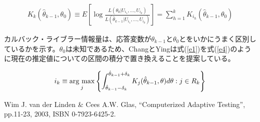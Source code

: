 \documentclass[a4j]{jarticle}
\begin{document}
\begin{eqnarray}
  \label{e3}
  K_{k}(\hat{\theta}_{k-1},\theta_{0}) \equiv E[\log\frac{L(\theta_{0}|U_{i_{1}},\ldots,U_{i_{k}})}{L(\hat{\theta}_{k-1}|U_{i_{1}},\ldots,U_{i_{k}})}] = \sum_{h=1}^{k}K_{i_{h}}(\hat{\theta}_{k-1},\theta_{0})
\end{eqnarray}

カルバック・ライブラー情報量は、応答変数が$\hat{\theta}_{k-1}$と$\theta_{0}$とをいかにうまく区別しているかを示す。$\theta_{0}$は未知であるため、ChangとYingは式(\ref{e1})を式(\ref{e4})のように現在の推定値についての区間の積分で置き換えることを提案している。

\newcommand{\argmax}{\mathop{\rm arg~max}\limits}
\begin{eqnarray}
  \label{e4}
  i_{k} \equiv \argmax_{j}\left\{\int_{\hat{\theta}_{k-1}-\delta_{k}}^{\hat{\theta}_{k-1}+\delta_{k}}K_{j}(\hat{\theta}_{k-1},\theta)d\theta:j\in R_{k}\right\}
\end{eqnarray}

\begin{thebibliography}{9}
   Wim J. van der Linden \& Cees A.W. Glas, ``Computerized Adaptive Testing'', pp.11-23, 2003, ISBN 0-7923-6425-2.
\end{thebibliography}
\end{document}

